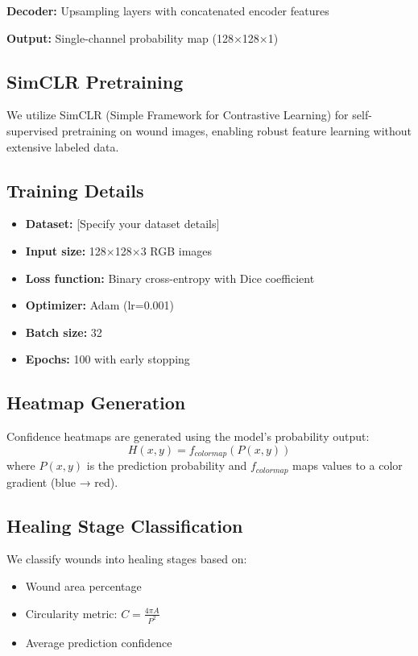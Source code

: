 \documentclass[conference]{IEEEtran}
\begin{document}
\textbf{Decoder:} Upsampling layers with concatenated encoder features

\textbf{Output:} Single-channel probability map (128×128×1)

\subsection{SimCLR Pretraining}
We utilize SimCLR (Simple Framework for Contrastive Learning) for self-supervised pretraining on wound images, enabling robust feature learning without extensive labeled data.

\subsection{Training Details}
\begin{itemize}
    \item \textbf{Dataset:} [Specify your dataset details]
    \item \textbf{Input size:} 128×128×3 RGB images
    \item \textbf{Loss function:} Binary cross-entropy with Dice coefficient
    \item \textbf{Optimizer:} Adam (lr=0.001)
    \item \textbf{Batch size:} 32
    \item \textbf{Epochs:} 100 with early stopping
\end{itemize}

\subsection{Heatmap Generation}
Confidence heatmaps are generated using the model's probability output:
\begin{equation}
H(x,y) = f_{colormap}(P(x,y))
\end{equation}
where $P(x,y)$ is the prediction probability and $f_{colormap}$ maps values to a color gradient (blue → red).

\subsection{Healing Stage Classification}
We classify wounds into healing stages based on:
\begin{itemize}
    \item Wound area percentage
    \item Circularity metric: $C = \frac{4\pi A}{P^2}$
    \item Average prediction confidence
\end{itemize}
\end{document}
